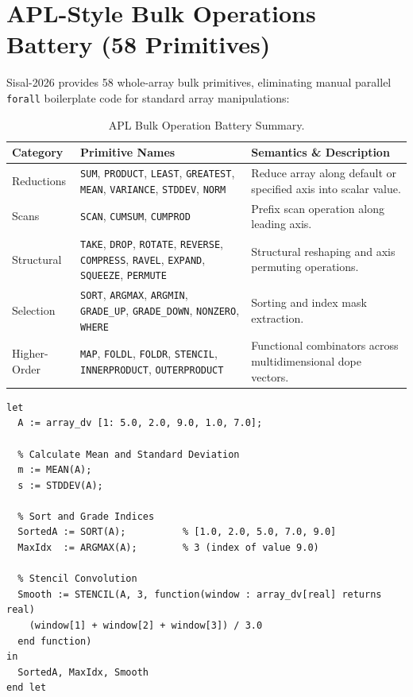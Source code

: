 \section{APL-Style Bulk Operations Battery (58 Primitives)}
Sisal-2026 provides 58 whole-array bulk primitives, eliminating manual parallel \texttt{forall} boilerplate code for standard array manipulations:

\begin{table}[h!]
\centering
\small
\begin{tabularx}{\textwidth}{l >{\raggedright\arraybackslash}p{4.0cm} >{\raggedright\arraybackslash}X}
\toprule
\textbf{Category} & \textbf{Primitive Names} & \textbf{Semantics \& Description} \\
\midrule
Reductions & \texttt{SUM}, \texttt{PRODUCT}, \texttt{LEAST}, \texttt{GREATEST}, \texttt{MEAN}, \texttt{VARIANCE}, \texttt{STDDEV}, \texttt{NORM} & Reduce array along default or specified axis into scalar value. \\
\addlinespace
Scans & \texttt{SCAN}, \texttt{CUMSUM}, \texttt{CUMPROD} & Prefix scan operation along leading axis. \\
\addlinespace
Structural & \texttt{TAKE}, \texttt{DROP}, \texttt{ROTATE}, \texttt{REVERSE}, \texttt{COMPRESS}, \texttt{RAVEL}, \texttt{EXPAND}, \texttt{SQUEEZE}, \texttt{PERMUTE} & Structural reshaping and axis permuting operations. \\
\addlinespace
Selection & \texttt{SORT}, \texttt{ARGMAX}, \texttt{ARGMIN}, \texttt{GRADE\_UP}, \texttt{GRADE\_DOWN}, \texttt{NONZERO}, \texttt{WHERE} & Sorting and index mask extraction. \\
\addlinespace
Higher-Order & \texttt{MAP}, \texttt{FOLDL}, \texttt{FOLDR}, \texttt{STENCIL}, \texttt{INNERPRODUCT}, \texttt{OUTERPRODUCT} & Functional combinators across multidimensional dope vectors. \\
\bottomrule
\end{tabularx}
\caption{APL Bulk Operation Battery Summary.}
\label{tab:bulk_ops}
\end{table}

\begin{lstlisting}[caption={Bulk Operation Battery Code Examples}]
let
  A := array_dv [1: 5.0, 2.0, 9.0, 1.0, 7.0];
  
  % Calculate Mean and Standard Deviation
  m := MEAN(A);
  s := STDDEV(A);
  
  % Sort and Grade Indices
  SortedA := SORT(A);          % [1.0, 2.0, 5.0, 7.0, 9.0]
  MaxIdx  := ARGMAX(A);        % 3 (index of value 9.0)
  
  % Stencil Convolution
  Smooth := STENCIL(A, 3, function(window : array_dv[real] returns real)
    (window[1] + window[2] + window[3]) / 3.0
  end function)
in
  SortedA, MaxIdx, Smooth
end let
\end{lstlisting}

